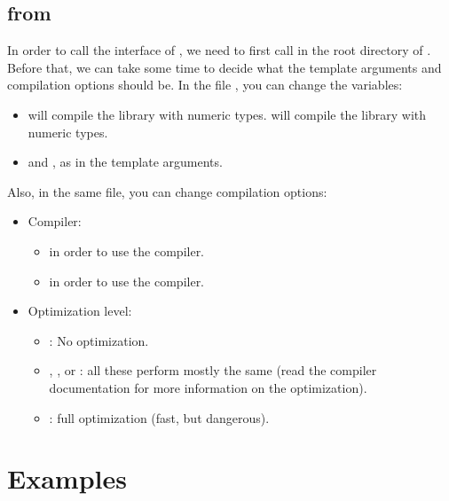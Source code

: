 \documentclass[10pt,utf8,compress,xcolor=dvipsnames]{beamer}
\begin{document}
\subsection{\mimes from \PY}
\begin{frame}[fragile]{\insertsubsectionhead}
	In order to call the \PY interface of \mimes, we need to first call  in the root directory of \mimes.\\[0.2cm]
	
	Before that, we can take some time to decide what the template arguments and compilation  options should be. In the 
	file , you can change the variables:
	\begin{itemize}
		\item {} will compile the library with  numeric types.  will compile the library with  numeric types.
		\item {} and , as in the template arguments.
	\end{itemize}
	
	Also, in the same file, you can change compilation options:
	\begin{itemize}
		\item Compiler:
		\begin{itemize}
			\item {} in order to use the  \CPP compiler.
			\item {} in order to use the  \CPP compiler.
		\end{itemize}
	\item Optimization level:
		\begin{itemize}
			\item {}: No optimization. 
			\item {}, , or : all these perform mostly the same (read the compiler documentation for more information on the optimization).
			\item {}: full optimization (fast, but dangerous). 
		\end{itemize}
	\end{itemize}
\end{frame}


\section{Examples}
\end{document}
